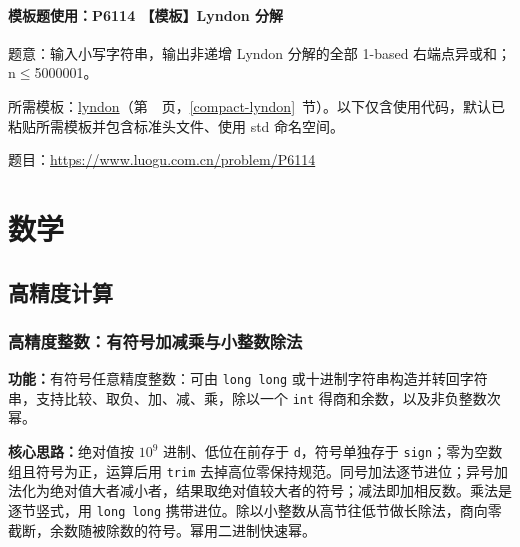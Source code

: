 

\Needspace{278pt}

\subsection*{模板题使用：P6114 【模板】Lyndon 分解}

\label{usage-example-372}

题意：输入小写字符串，输出非递增 Lyndon 分解的全部 1-based 右端点异或和；n$\le$5000001。

所需模板：\hyperref[compact-lyndon]{lyndon}（第~\pageref{compact-lyndon}~页，\ref{compact-lyndon}~节）。以下仅含使用代码，默认已粘贴所需模板并包含标准头文件、使用 std 命名空间。

题目：\url{https://www.luogu.com.cn/problem/P6114}



\part{数学}

\newpage

\chapter{高精度计算}

\section{高精度整数：有符号加减乘与小整数除法}\label{compact-BigInteger}

\noindent\textbf{功能：}\allowbreak 有符号任意精度整数：可由 \texttt{long long} 或十进制字符串构造并转回字符串，支持比较、取负、加、减、乘，除以一个 \texttt{int} 得商和余数，以及非负整数次幂。

\textbf{核心思路：}\allowbreak 绝对值按 $10^9$ 进制、低位在前存于 \texttt{d}，符号单独存于 \texttt{sign}；零为空数组且符号为正，运算后用 \texttt{trim} 去掉高位零保持规范。同号加法逐节进位；异号加法化为绝对值大者减小者，结果取绝对值较大者的符号；减法即加相反数。乘法是逐节竖式，用 \texttt{long long} 携带进位。除以小整数从高节往低节做长除法，商向零截断，余数随被除数的符号。幂用二进制快速幂。


